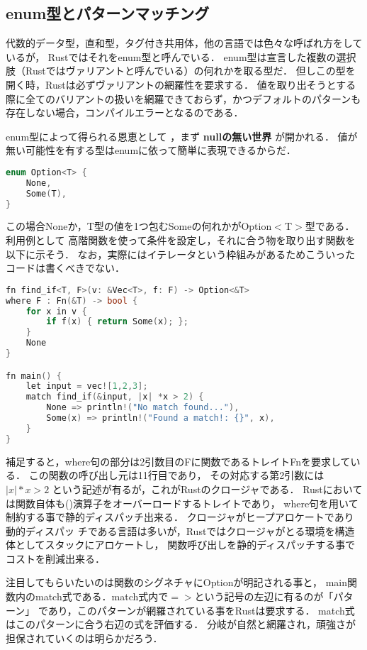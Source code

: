 \subsection{enum型とパターンマッチング}
代数的データ型，直和型，タグ付き共用体，他の言語では色々な呼ばれ方をしているが，
Rustではそれをenum型と呼んでいる．
enum型は宣言した複数の選択肢（Rustではヴァリアントと呼んでいる）の何れかを取る型だ．
但しこの型を開く時，Rustは必ずヴァリアントの網羅性を要求する．
値を取り出そうとする際に全てのバリアントの扱いを網羅できておらず，かつデフォルトのパターンも存在しない場合，コンパイルエラーとなるのである．

enum型によって得られる恩恵として
，まず \textbf{nullの無い世界} が開かれる．
値が無い可能性を有する型はenumに依って簡単に表現できるからだ．

\begin{lstlisting}[language={C++},caption=Option型,label=option_t]
enum Option<T> {
    None,
    Some(T),
}
\end{lstlisting}

この場合Noneか，T型の値を1つ包むSomeの何れかがOption$<$T$>$型である．
利用例として
高階関数を使って条件を設定し，それに合う物を取り出す関数を以下に示そう．
なお，実際にはイテレータという枠組みがあるためこういったコードは書くべきでない．

\begin{lstlisting}[language={C++},caption=条件に応じた値が見つかれば返す関数,label=find_if]
fn find_if<T, F>(v: &Vec<T>, f: F) -> Option<&T>
where F : Fn(&T) -> bool {
    for x in v {
        if f(x) { return Some(x); };
    }
    None
}

fn main() {
    let input = vec![1,2,3];
    match find_if(&input, |x| *x > 2) {
        None => println!("No match found..."),
        Some(x) => println!("Found a match!: {}", x),
    }
}
\end{lstlisting}

補足すると，where句の部分は2引数目のFに関数であるトレイトFnを要求している．
この関数の呼び出し元は11行目であり，
その対応する第2引数には $|x| *x > 2$ という記述が有るが，これがRustのクロージャである．
Rustにおいては関数自体も()演算子をオーバーロードするトレイトであり，
where句を用いて制約する事で静的ディスパッチ出来る．
クロージャがヒープアロケートであり動的ディスパッ
チである言語は多いが，Rustではクロージャがとる環境を構造体としてスタックにアロケートし，
関数呼び出しを静的ディスパッチする事でコストを削減出来る．

注目してもらいたいのは関数のシグネチャにOptionが明記される事と，
main関数内のmatch式である．match式内で$=>$という記号の左辺に有るのが「パターン」
であり，このパターンが網羅されている事をRustは要求する．
match式はこのパターンに合う右辺の式を評価する．
分岐が自然と網羅され，頑強さが担保されていくのは明らかだろう．

